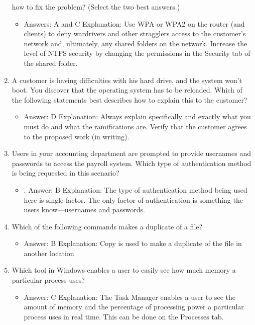 \documentclass{article}
\begin{document}
\begin{enumerate}
how to fix the problem? (Select the two best answers.)
    \begin{itemize}
        \item Answers: A and C
Explanation: Use WPA or WPA2 on the router (and clients) to deny wardrivers and
other stragglers access to the customer’s network and, ultimately, any shared folders
on the network. Increase the level of NTFS security by changing the permissions in the
Security tab of the shared folder.
    \end{itemize}
    \item A customer is having difficulties with his hard drive, and the system
won’t boot. You discover that the operating system has to be
reloaded. Which of the following statements best describes how to
explain this to the customer?
    \begin{itemize}
        \item Answer: D
Explanation: Always explain specifically and exactly what you must do and what the
ramifications are. Verify that the customer agrees to the proposed work (in writing).
    \end{itemize}
    \item Users in your accounting department are prompted to provide
usernames and passwords to access the payroll system. Which
type of authentication method is being requested in this scenario?
    \begin{itemize}
        \item . Answer: B
Explanation: The type of authentication method being used here is single-factor. The
only factor of authentication is something the users know—usernames and passwords.
    \end{itemize}
    \item Which of the following commands makes a duplicate of a file?
    \begin{itemize}
        \item Answer: B
Explanation: Copy is used to make a duplicate of the file in another location
    \end{itemize}
    \item Which tool in Windows enables a user to easily see how much
memory a particular process uses?
    \begin{itemize}
        \item Answer: C
Explanation: The Task Manager enables a user to see the amount of memory and the
percentage of processing power a particular process uses in real time. This can be
done on the Processes tab.
    \end{itemize}

\end{enumerate}
\end{document}
